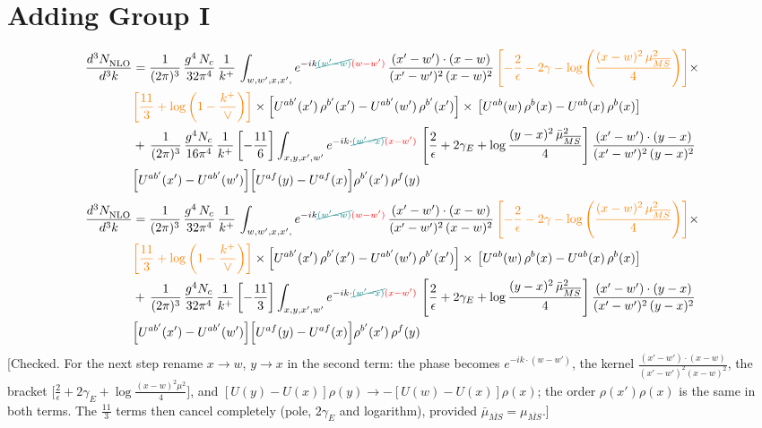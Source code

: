 \documentclass[9pt]{article}
\numberwithin{equation}{section}
\begin{document}
\section{Adding Group I}
\begin{align}
     \frac{d^{3}N_{\rm NLO}^{\rm}}{d^{3}k} &  =  \frac{1}{(2\pi)^{3}}\, \frac{g^{4}\,N_{c}}{32\pi^{4}}\,\frac{1}{k^{+}}\, \int_{w, w',x,x',} e^{-ik{\color{teal}\cancel{(w^\prime-w)}}{\color{red}(w-w^\prime)}}\, \frac{(x'-w')\cdot (x-w)}{(x'-w')^{2}\, (x-w)^{2}}\, {\color{orange}\left[-\frac{2}{\epsilon}-2\gamma-\log{\left(\frac{(x-w)^{2}\,\mu^{2}_{\overline{MS}}}{4}\right)}\right]}\times \notag \\ & {\color{orange}\left[\frac{11}{3}+\log{\left(1-\frac{k^{+}}{\vee}\right)}\right]}\times\left[U^{ab'}(x')\,\rho^{b'}(x') - U^{ab'}(w')\,\rho^{b'}(x')\right]\times\,\left[U^{ab}(w)\,\rho^{b}(x) - U^{ab}(x)\,\rho^{b}(x)\right]\notag \\ & +\,\frac{1}{(2\pi)^{3}}\,\frac{g^{4}N_{c}}{16\pi^{4}}\,\frac{1}{k^{+}}\left[-\frac{11}{6}\right]\int_{x,y,x',w'}e^{-ik\cdot{\color{teal}\cancel{(w'-x)}}{\color{red}(x-w')}}\,\left[\frac{2}{\epsilon}+2\gamma_{E}+\log\frac{(y-x)^{2}\,\bar\mu^{2}_{\overline{MS}}}{4}\right]\frac{(x'-w')\cdot(y-x)}{(x'-w')^{2}\,(y-x)^{2}}\notag \\ & \Big[U^{ab'}(x')-U^{ab'}(w')\Big]\Big[U^{af}(y)-U^{af}(x)\Big]\rho^{b'}(x')\,\rho^{f}(y)
\end{align}
\begin{align}
     \frac{d^{3}N_{\rm NLO}^{\rm}}{d^{3}k} &  =  \frac{1}{(2\pi)^{3}}\, \frac{g^{4}\,N_{c}}{32\pi^{4}}\,\frac{1}{k^{+}}\, \int_{w, w',x,x',} e^{-ik{\color{teal}\cancel{(w^\prime-w)}}{\color{red}(w-w^\prime)}}\, \frac{(x'-w')\cdot (x-w)}{(x'-w')^{2}\, (x-w)^{2}}\, {\color{orange}\left[-\frac{2}{\epsilon}-2\gamma-\log{\left(\frac{(x-w)^{2}\,\mu^{2}_{\overline{MS}}}{4}\right)}\right]}\times \notag \\ & {\color{orange}\left[\frac{11}{3}+\log{\left(1-\frac{k^{+}}{\vee}\right)}\right]}\times\left[U^{ab'}(x')\,\rho^{b'}(x') - U^{ab'}(w')\,\rho^{b'}(x')\right]\times\,\left[U^{ab}(w)\,\rho^{b}(x) - U^{ab}(x)\,\rho^{b}(x)\right]\notag \\ & +\,\frac{1}{(2\pi)^{3}}\,\frac{g^{4}N_{c}}{32\pi^{4}}\,\frac{1}{k^{+}}\left[-\frac{11}{3}\right]\int_{x,y,x',w'}e^{-ik\cdot{\color{teal}\cancel{(w'-x)}}{\color{red}(x-w')}}\,\left[\frac{2}{\epsilon}+2\gamma_{E}+\log\frac{(y-x)^{2}\,\bar\mu^{2}_{\overline{MS}}}{4}\right]\frac{(x'-w')\cdot(y-x)}{(x'-w')^{2}\,(y-x)^{2}}\notag \\ & \Big[U^{ab'}(x')-U^{ab'}(w')\Big]\Big[U^{af}(y)-U^{af}(x)\Big]\rho^{b'}(x')\,\rho^{f}(y)
\end{align} {\color{red}[Checked. For the next step rename $x\to w$, $y\to x$ in the second term: the phase becomes $e^{-ik\cdot(w-w')}$, the kernel $\frac{(x'-w')\cdot(x-w)}{(x'-w')^{2}(x-w)^{2}}$, the bracket $\big[\frac{2}{\epsilon}+2\gamma_{E}+\log\frac{(x-w)^{2}\mu^{2}}{4}\big]$, and $[U(y)-U(x)]\rho(y)\to-[U(w)-U(x)]\rho(x)$; the order $\rho(x')\rho(x)$ is the same in both terms. The $\frac{11}{3}$ terms then cancel completely (pole, $2\gamma_{E}$ and logarithm), provided $\bar\mu_{\overline{MS}}=\mu_{\overline{MS}}$.]}\par\noindent
\end{document}
